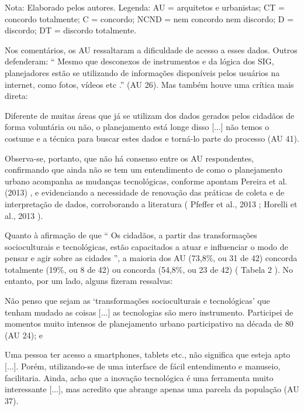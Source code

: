 \documentclass{article}
\begin{document}
Nota: Elaborado pelos autores. Legenda: AU = arquitetos e urbanistas;
								CT = concordo totalmente; C = concordo; NCND = nem concordo nem
								discordo; D = discordo; DT = discordo totalmente.

Nos comentários, os AU ressaltaram a dificuldade de acesso a esses dados. Outros
					defenderam: “%
Mesmo que desconexos de instrumentos e da lógica dos SIG,
						planejadores estão se utilizando de informações disponíveis pelos usuários
						na internet, como fotos, vídeos etc%
.” (AU 26). Mas também houve uma
					crítica mais direta: 

Diferente de muitas áreas que já se utilizam dos dados gerados pelos cidadãos
						de forma voluntária ou não, o planejamento está longe disso
[...]%
 não temos o costume e a técnica para buscar estes
						dados e torná-lo parte do processo %
(AU 41).%


Observa-se, portanto, que não há consenso entre os AU respondentes, confirmando
					que ainda não se tem um entendimento de como o planejamento urbano acompanha as
					mudanças tecnológicas, conforme apontam %
Pereira
						et al. (2013)%
, e evidenciando a necessidade de renovação das práticas
					de coleta e de interpretação de dados, corroborando a literatura (%
Pfeffer et al., 2013%
; %
Horelli et al., 2013%
).

Quanto à afirmação de que “%
Os cidadãos, a partir das transformações
						socioculturais e tecnológicas, estão capacitados a atuar e influenciar o
						modo de pensar e agir sobre as cidades%
”, a maioria dos AU (73,8\%,
					ou 31 de 42) concorda totalmente (19\%, ou 8 de 42) ou concorda (54,8\%, ou 23 de
					42) (%
Tabela 2%
). No entanto, por um lado,
					alguns fizeram ressalvas: 

Não penso que sejam as ‘transformações socioculturais e tecnológicas’ que
						tenham mudado as coisas [...] as tecnologias são mero instrumento.
						Participei de momentos muito intensos de planejamento urbano participativo
						na década de 80 %
(AU 24); e%


Uma pessoa ter acesso a smartphones, tablets etc., não significa que esteja
						apto %
[...].%
 Porém, utilizando-se de uma interface de fácil
						entendimento e manuseio, facilitaria. Ainda, acho que a inovação tecnológica
						é uma ferramenta muito interessante %
[...],%
 mas acredito que
						abrange apenas uma parcela da população %
(AU 37).%
\end{document}
